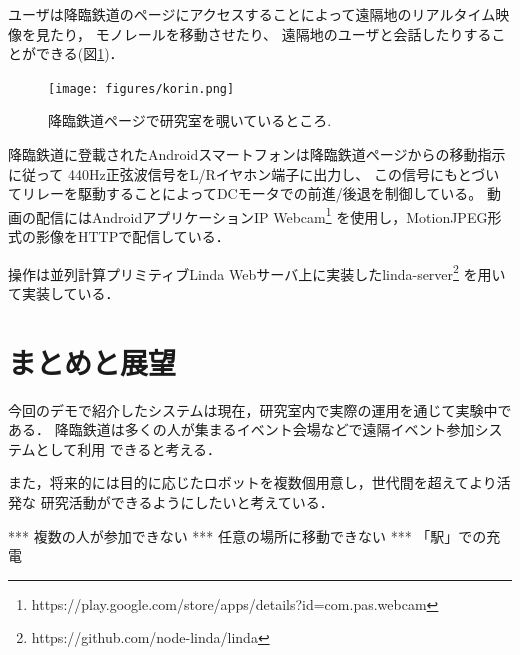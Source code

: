 \documentclass[submit,techreq]{ipsj}
\begin{document}
ユーザは降臨鉄道のページにアクセスすることによって遠隔地のリアルタイム映像を見たり，
モノレールを移動させたり、
遠隔地のユーザと会話したりすることができる(図\ref{browser})．

\begin{figure}[H]
\begin{center}
\texttt{[image: figures/korin.png]}
\end{center}
\caption{降臨鉄道ページで研究室を覗いているところ.}
\label{browser}
\end{figure}

降臨鉄道に登載されたAndroidスマートフォンは降臨鉄道ページからの移動指示に従って
440Hz正弦波信号をL/Rイヤホン端子に出力し、
この信号にもとづいてリレーを駆動することによってDCモータでの前進/後退を制御している。
動画の配信にはAndroidアプリケーションIP Webcam\footnote{
  \textsf{https://play.google.com/store/apps/details?id=com.pas.webcam}
}
を使用し，MotionJPEG形式の影像をHTTPで配信している．

操作は並列計算プリミティブLinda\cite{Carriero:1989:LC:63334.63337}
Webサーバ上に実装したlinda-server\footnote{
  \textsf{https://github.com/node-linda/linda}
}
を用いて実装している．

\section{まとめと展望}

今回のデモで紹介したシステムは現在，研究室内で実際の運用を通じて実験中である．
降臨鉄道は多くの人が集まるイベント会場などで遠隔イベント参加システムとして利用
できると考える．

また，将来的には目的に応じたロボットを複数個用意し，世代間を超えてより活発な
研究活動ができるようにしたいと考えている．


*** 複数の人が参加できない *** 任意の場所に移動できない *** 「駅」での充電

{\scriptsize


}
\end{document}

